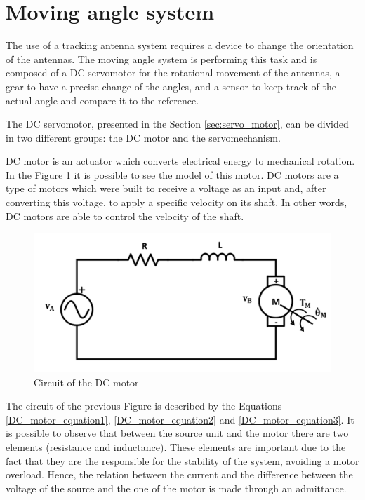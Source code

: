 
\section{Moving angle system}\label{sec:servo_model}


The use of a tracking antenna system requires a device to change the orientation of the antennas. The moving angle system is performing this task and is composed of a DC servomotor for the rotational movement of the antennas, a gear to have a precise change of the angles, and a sensor to keep track of the actual angle and compare it to the reference.

The DC servomotor, presented in the Section \ref{sec:servo_motor}, can be divided in two different groups: the DC motor and the servomechanism.

DC motor is an actuator which converts electrical energy to mechanical rotation. In the Figure \ref{dcmotor_circuit} it is possible to see the model of this motor. DC motors are a type of motors which were built to receive a voltage as an input and, after converting this voltage, to apply a specific velocity on its shaft. In other words, DC motors are able to control the velocity of the shaft.

\begin{figure}[H]
\centering
\includegraphics[scale=0.5]{figures/dcmotor_circuit.png}
\caption{Circuit of the DC motor}
\label{dcmotor_circuit}
\end{figure}

The circuit of the previous Figure is described by the Equations \ref{DC_motor_equation1}, \ref{DC_motor_equation2} and \ref{DC_motor_equation3}. It is possible to observe that between the source unit and the motor there are two elements (resistance and inductance). These elements are important due to the fact that they are the responsible for the stability of the system, avoiding a motor overload. Hence, the relation between the current and the difference between the voltage of the source and the one of the motor is made through an admittance.

